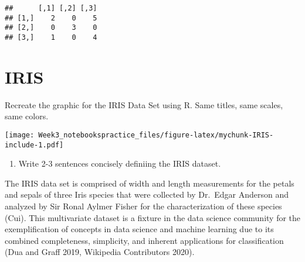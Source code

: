 \documentclass{article}
\providecommand{\tightlist}{%
  \setlength{\itemsep}{0pt}\setlength{\parskip}{0pt}}
\newenvironment{Shaded}{\begin{snugshade}}{\end{snugshade}}
\newcommand{\DataTypeTok}[1]{\textcolor[rgb]{0.13,0.29,0.53}{#1}}
\newcommand{\DecValTok}[1]{\textcolor[rgb]{0.00,0.00,0.81}{#1}}
\newcommand{\KeywordTok}[1]{\textcolor[rgb]{0.13,0.29,0.53}{\textbf{#1}}}
\newcommand{\NormalTok}[1]{#1}
\newcommand{\OperatorTok}[1]{\textcolor[rgb]{0.81,0.36,0.00}{\textbf{#1}}}
\newcommand{\StringTok}[1]{\textcolor[rgb]{0.31,0.60,0.02}{#1}}
\begin{document}
\begin{verbatim}
##      [,1] [,2] [,3]
## [1,]    2    0    5
## [2,]    0    3    0
## [3,]    1    0    4
\end{verbatim}

\hypertarget{iris}{%
\section{IRIS}\label{iris}}

Recreate the graphic for the IRIS Data Set using R. Same titles, same
scales, same colors.

\begin{Shaded}
\end{Shaded}

\texttt{[image: Week3\_notebookspractice\_files/figure-latex/mychunk-IRIS-include-1.pdf]}

\begin{enumerate}
\def\labelenumi{\arabic{enumi}.}
\setcounter{enumi}{2}
\tightlist
\item
  Write 2-3 sentences concisely definiing the IRIS dataset.
\end{enumerate}

The IRIS data set is comprised of width and length measurements for the
petals and sepals of three Iris species that were collected by Dr.~Edgar
Anderson and analyzed by Sir Ronal Aylmer Fisher for the
characterization of these species (Cui). This multivariate dataset is a
fixture in the data science community for the exemplification of
concepts in data science and machine learning due to its combined
completeness, simplicity, and inherent applications for classification
\citeyearpar[ \& Graff 2019]{Dua}(Dua and Graff 2019, Wikipedia
Contributors 2020).
\end{document}
